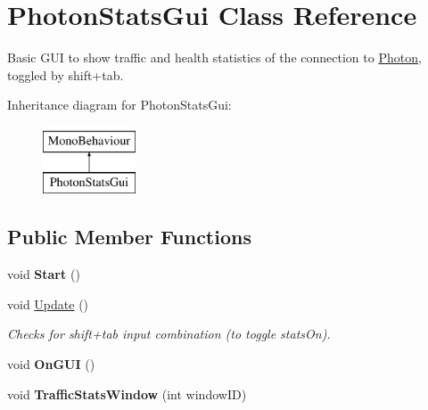 \hypertarget{class_photon_stats_gui}{}\section{Photon\+Stats\+Gui Class Reference}
\label{class_photon_stats_gui}


Basic G\+UI to show traffic and health statistics of the connection to \hyperlink{namespace_photon}{Photon}, toggled by shift+tab.  


Inheritance diagram for Photon\+Stats\+Gui\+:\begin{figure}[H]
\begin{center}
\leavevmode
\includegraphics[height=2.000000cm]{class_photon_stats_gui}
\end{center}
\end{figure}
\subsection*{Public Member Functions}
\begin{DoxyCompactItemize}
\item 
void {\bfseries Start} ()\hypertarget{class_photon_stats_gui_ae7fb408f7fb6e9525337271d2363ae33}{}\label{class_photon_stats_gui_ae7fb408f7fb6e9525337271d2363ae33}

\item 
void \hyperlink{class_photon_stats_gui_a222bbb9f4b1c640489101a5f3bcada8a}{Update} ()
\begin{DoxyCompactList}\small\item\em Checks for shift+tab input combination (to toggle stats\+On).\end{DoxyCompactList}\item 
void {\bfseries On\+G\+UI} ()\hypertarget{class_photon_stats_gui_a8aa98b7db81d540b6e9c42f37d3a927b}{}\label{class_photon_stats_gui_a8aa98b7db81d540b6e9c42f37d3a927b}

\item 
void {\bfseries Traffic\+Stats\+Window} (int window\+ID)\hypertarget{class_photon_stats_gui_a58101a043bbe7de9d53f14ac111646b2}{}\label{class_photon_stats_gui_a58101a043bbe7de9d53f14ac111646b2}

\end{DoxyCompactItemize}
